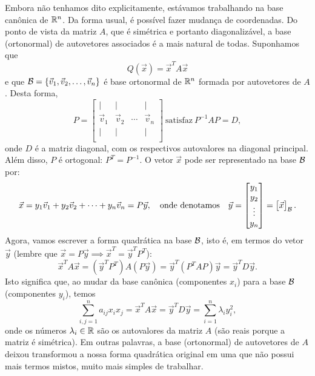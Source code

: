 \documentclass[../livro.tex]{subfiles}
\begin{document}
Embora não tenhamos dito explicitamente, estávamos trabalhando na base canônica de $\mathbb{R}^n$. Da forma usual, é possível fazer mudança de coordenadas. Do ponto de vista da matriz $A$, que é simétrica e portanto diagonalizável, a base (ortonormal) de autovetores associados é a mais natural de todas. Suponhamos que 
\[
Q(\vec{x}) = \vec{x}^T A \vec{x}
\] e que $\mathcal{B} = \{ \vec{v}_1, \vec{v}_2, \dots, \vec{v}_n\}$ é base ortonormal de $\mathbb{R}^n$ formada por autovetores de $A$. Desta forma,
\[
P = 
\begin{bmatrix}
| & | &   & |  \\
\vec{v}_1 & \vec{v}_2 & \cdots & \vec{v}_n \\
| & | &   & |  \\
\end{bmatrix} \ \text{satisfaz} \ P^{-1}AP = D,
\] onde $D$ é a matriz diagonal, com os respectivos autovalores na diagonal principal. Além disso, $P$ é ortogonal: $P^T = P^{-1}$. O vetor $\vec{x}$ pode ser representado na base $\mathcal{B}$ por:
\[
\vec{x} = y_1 \vec{v}_1 + y_2 \vec{v}_2 + \cdots + y_n \vec{v}_n = P\vec{y}, \quad \text{onde denotamos} \quad \vec{y} = 
\begin{bmatrix}
y_1 \\ y_2 \\ \vdots \\ y_n
\end{bmatrix} = 
\begin{bmatrix}
\vec{x}
\end{bmatrix}_{\mathcal{B}}.
\] Agora, vamos escrever a forma quadrática na base $\mathcal{B}$, isto é, em termos do vetor $\vec{y}$ (lembre que $\vec{x} = P \vec{y} \implies \vec{x}^T = \vec{y}^T P^T$):
\[
\vec{x}^T A \vec{x} = (\vec{y}^T P^T) A (P \vec{y}) = \vec{y}^T (P^T A P) \vec{y} = \vec{y}^T D \vec{y}.
\] Isto significa que, ao mudar da base canônica (componentes $x_i$) para a base $\mathcal{B}$ (componentes $y_i$), temos
\[
\sum_{i,j=1}^{n} a_{ij} x_i x_j = \vec{x}^T A \vec{x} = \vec{y}^T D \vec{y} = \sum_{i=1}^{n} \lambda_i y_i^2,
\] onde os números $\lambda_i \in \mathbb{R}$ são os autovalores da matriz $A$ (são reais porque a matriz é simétrica). Em outras palavras, a base (ortonormal) de autovetores de $A$ deixou transformou a nossa forma quadrática original em uma que não possui mais termos mistos, muito mais simples de trabalhar.
\end{document}

